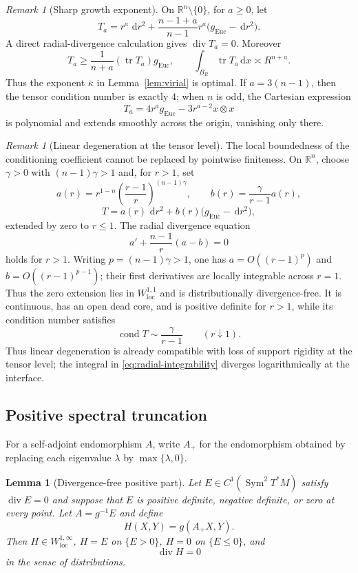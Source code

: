 \documentclass[11pt,reqno]{amsart}
\newtheorem{lemma}[theorem]{Lemma}
\theoremstyle{definition}
\theoremstyle{remark}
\newtheorem{remark}[theorem]{Remark}
\newcommand{\tr}{\operatorname{tr}}
\newcommand{\diver}{\operatorname{div}}
\newcommand{\dd}{\,\mathrm d}
\newcommand{\R}{\mathbb R}
\begin{document}
\begin{remark}[Sharp growth exponent]\label{rem:sharp-exponent}
On $\R^n\setminus\{0\}$, for $a\ge0$, let
\[
T_a=r^a\,\dd r^2+\frac{n-1+a}{n-1}r^a\bigl(g_{\mathrm{Euc}}-\dd r^2\bigr).
\]
A direct radial-divergence calculation gives $\diver T_a=0$.  Moreover
\[
T_a\ge\frac1{n+a}(\tr T_a)g_{\mathrm{Euc}},
\qquad
\int_{B_R}\tr T_a\dd x\asymp R^{n+a}.
\]
Thus the exponent $\bar\kappa$ in Lemma~\ref{lem:virial} is optimal.  If $a=3(n-1)$, then the tensor condition number is exactly $4$; when $n$ is odd, the Cartesian expression
\[
T_a=4r^a g_{\mathrm{Euc}}-3r^{a-2}x\otimes x
\]
is polynomial and extends smoothly across the origin, vanishing only there.
\end{remark}

\begin{remark}[Linear degeneration at the tensor level]\label{rem:linear-tensor}
The local boundedness of the conditioning coefficient cannot be replaced by pointwise finiteness.  On $\R^n$, choose $\gamma>0$ with $(n-1)\gamma>1$ and, for $r>1$, set
\[
a(r)=r^{1-n}\left(\frac{r-1}{r}\right)^{(n-1)\gamma},
\qquad
b(r)=\frac{\gamma}{r-1}a(r),
\]
\[
T=a(r)\,\dd r^2+b(r)\bigl(g_{\mathrm{Euc}}-\dd r^2\bigr),
\]
extended by zero to $r\le1$.  The radial divergence equation
\[
a'+\frac{n-1}{r}(a-b)=0
\]
holds for $r>1$.  Writing $p=(n-1)\gamma>1$, one has $a=O((r-1)^p)$ and $b=O((r-1)^{p-1})$; their first derivatives are locally integrable across $r=1$.  Thus the zero extension lies in $W^{1,1}_{\mathrm{loc}}$ and is distributionally divergence-free.  It is continuous, has an open dead core, and is positive definite for $r>1$, while its condition number satisfies
\[
\operatorname{cond}T\sim\frac{\gamma}{r-1}
\qquad(r\downarrow1).
\]
Thus linear degeneration is already compatible with loss of support rigidity at the tensor level; the integral in \eqref{eq:radial-integrability} diverges logarithmically at the interface.
\end{remark}

\subsection{Positive spectral truncation}

For a self-adjoint endomorphism $A$, write $A_+$ for the endomorphism obtained by replacing each eigenvalue $\lambda$ by $\max\{\lambda,0\}$.

\begin{lemma}[Divergence-free positive part]\label{lem:positive-part}
Let $E\in C^1(\operatorname{Sym}^2T^*M)$ satisfy $\diver E=0$ and suppose that $E$ is positive definite, negative definite, or zero at every point.  Let $A=g^{-1}E$ and define
\[
H(X,Y)=g(A_+X,Y).
\]
Then $H\in W^{1,\infty}_{\mathrm{loc}}$, $H=E$ on $\{E>0\}$, $H=0$ on $\{E\le0\}$, and
\[
\diver H=0
\]
in the sense of distributions.
\end{lemma}
\end{document}
